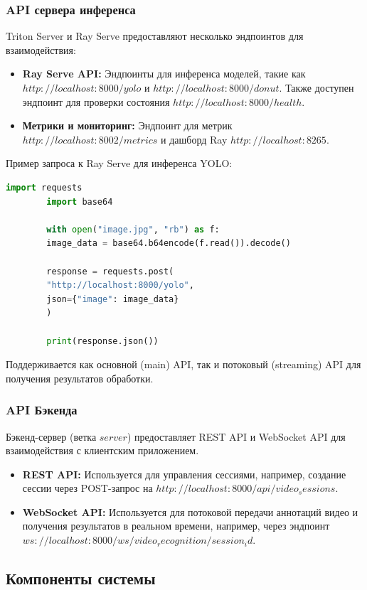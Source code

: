 \documentclass[12pt, a4paper]{article}
\theoremstyle{definition}
\theoremstyle{remark}
\begin{document}
	\subsubsection{API сервера инференса}
	Triton Server и Ray Serve предоставляют несколько эндпоинтов для взаимодействия:
	\begin{itemize}
		\item \textbf{Ray Serve API:} Эндпоинты для инференса моделей, такие как $http://localhost:8000/yolo$ и $http://localhost:8000/donut$. Также доступен эндпоинт для проверки состояния $http://localhost:8000/health$.
		\item \textbf{Метрики и мониторинг:} Эндпоинт для метрик $http://localhost:8002/metrics$ и дашборд Ray $http://localhost:8265$.
	\end{itemize}
	Пример запроса к Ray Serve для инференса YOLO:
	\begin{lstlisting}[language=python, caption=Пример запроса к Ray Serve для YOLO]
		import requests
		import base64
		
		with open("image.jpg", "rb") as f:
		image_data = base64.b64encode(f.read()).decode()
		
		response = requests.post(
		"http://localhost:8000/yolo",
		json={"image": image_data}
		)
		
		print(response.json())
	\end{lstlisting}
	Поддерживается как основной (main) API, так и потоковый (streaming) API для получения результатов обработки.
	
	\subsubsection{API Бэкенда}
	Бэкенд-сервер (ветка $server$) предоставляет REST API и WebSocket API для взаимодействия с клиентским приложением.
	\begin{itemize}
		\item \textbf{REST API:} Используется для управления сессиями, например, создание сессии через POST-запрос на $http://localhost:8000/api/video_sessions$.
		\item \textbf{WebSocket API:} Используется для потоковой передачи аннотаций видео и получения результатов в реальном времени, например, через эндпоинт $ws://localhost:8000/ws/video_recognition/{session_id}$.
	\end{itemize}
	
	\subsection{Компоненты системы}
\end{document}
